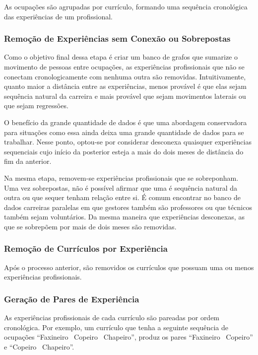 \documentclass[12pt,a4paper]{article}
\begin{document}
As ocupações são agrupadas por currículo, formando uma sequência cronológica das experiências de um profissional.

\subsubsection{Remoção de Experiências sem Conexão ou Sobrepostas}

Como o objetivo final dessa etapa é criar um banco de grafos que sumarize o movimento de pessoas entre ocupações, as experiências profissionais que não se conectam cronologicamente com nenhuma outra são removidas. Intuitivamente, quanto maior a distância entre as experiências, menos provável é que elas sejam sequência natural da carreira e mais provável que sejam movimentos laterais ou que sejam regressões.

O benefício da grande quantidade de dados é que uma abordagem conservadora para situações como essa ainda deixa uma grande quantidade de dados para se trabalhar. Nesse ponto, optou-se por considerar desconexa quaisquer experiências sequenciais cujo início da posterior esteja a mais do dois meses de distância do fim da anterior.

Na mesma etapa, removem-se experiências profissionais que se sobreponham. Uma vez sobrepostas, não é possível afirmar que uma é sequência natural da outra ou que sequer tenham relação entre si. É comum encontrar no banco de dados carreiras paralelas em que gestores também são professores ou que técnicos também sejam voluntários. Da mesma maneira que experiências desconexas, as que se sobrepõem por mais de dois meses são removidas.

\subsubsection{Remoção de Currículos por Experiência}

Após o processo anterior, são removidos os currículos que possuam uma ou menos experiências profissionais.

\subsubsection{Geração de Pares de Experiência}

As experiências profissionais de cada currículo são pareadas por ordem cronológica. Por exemplo, um currículo que tenha a seguinte sequência de ocupações \enquote{Faxineiro \textrightarrow~Copeiro \textrightarrow~Chapeiro}, produz os pares \enquote{Faxineiro \textrightarrow~Copeiro} e \enquote{Copeiro \textrightarrow~Chapeiro}.~
\end{document}
